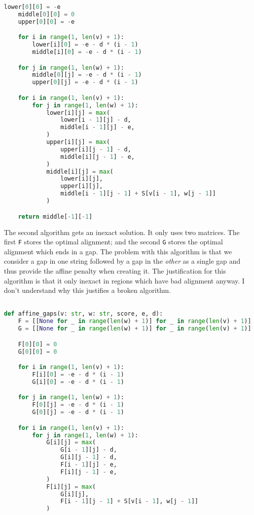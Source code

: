 \documentclass[10pt,\jkfside,a4paper]{article}
\begin{document}
\begin{enumerate}
\begin{lstlisting}[language=python]
    lower[0][0] = -e
    middle[0][0] = 0
    upper[0][0] = -e

    for i in range(1, len(v) + 1):
        lower[i][0] = -e - d * (i - 1)
        middle[i][0] = -e - d * (i - 1)

    for j in range(1, len(w) + 1):
        middle[0][j] = -e - d * (i - 1)
        upper[0][j] = -e - d * (i - 1)

    for i in range(1, len(v) + 1):
        for j in range(1, len(w) + 1):
            lower[i][j] = max(
                lower[i - 1][j] - d,
                middle[i - 1][j] - e,
            )
            upper[i][j] = max(
                upper[i][j - 1] - d,
                middle[i][j - 1] - e,
            )
            middle[i][j] = max(
                lower[i][j],
                upper[i][j],
                middle[i - 1][j - 1] + S[v[i - 1], w[j - 1]]
            )

    return middle[-1][-1]

    \end{lstlisting}

    The second algorithm gets an inexact solution. It only uses two matrices. The first \texttt{F} stores the optimal alignment; and the second \texttt{G} stores the optimal alignment which ends in a gap. The
    problem with this algorithm is that we consider a gap in one string followed by a gap in the \textit{other} as a single gap and thus provide the affine penalty when creating it. The justification for this
    algorithm is that it only inexact in regions which have bad alignment anyway. I don't understand why this justifies a broken algorithm.

    \begin{lstlisting}[language=python]

def affine_gaps(v: str, w: str, score, e, d):
    F = [[None for _ in range(len(w) + 1)] for _ in range(len(v) + 1)]
    G = [[None for _ in range(len(w) + 1)] for _ in range(len(v) + 1)]

    F[0][0] = 0
    G[0][0] = 0

    for i in range(1, len(v) + 1):
        F[i][0] = -e - d * (i - 1)
        G[i][0] = -e - d * (i - 1)

    for j in range(1, len(w) + 1):
        F[0][j] = -e - d * (i - 1)
        G[0][j] = -e - d * (i - 1)

    for i in range(1, len(v) + 1):
        for j in range(1, len(w) + 1):
            G[i][j] = max(
                G[i - 1][j] - d,
                G[i][j - 1] - d,
                F[i - 1][j] - e,
                F[i][j - 1] - e,
            )
            F[i][j] = max(
                G[i][j],
                F[i - 1][j - 1] + S[v[i - 1], w[j - 1]]
            )


\end{lstlisting}
\end{enumerate}
\end{document}
